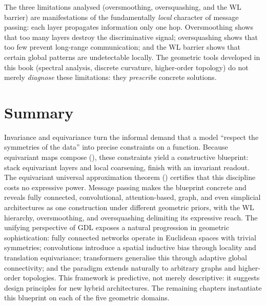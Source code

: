 The three limitations analysed (oversmoothing, oversquashing, and the WL barrier)
are manifestations of the fundamentally \emph{local} character of message
passing: each layer propagates information only one hop. Oversmoothing shows that
too many layers destroy the discriminative signal; oversquashing shows that too
few prevent long-range communication; and the WL barrier shows that certain
global patterns are undetectable locally. The geometric tools developed in this
book (spectral analysis, discrete curvature, higher-order topology) do not merely
\emph{diagnose} these limitations: they \emph{prescribe} concrete solutions.

\section{Summary}
\label{sec:priors:summary}

Invariance and equivariance turn the informal demand that a model ``respect the
symmetries of the data'' into precise constraints on a function. Because
equivariant maps compose (), these constraints yield
a constructive blueprint: stack equivariant layers and local coarsening, finish
with an invariant readout. The equivariant universal approximation theorem
() certifies that this discipline costs no expressive
power. Message passing makes the blueprint concrete and reveals fully connected,
convolutional, attention-based, graph, and even simplicial architectures as one
construction under different geometric priors, with the WL hierarchy,
oversmoothing, and oversquashing delimiting its expressive reach. The unifying
perspective of GDL exposes a natural progression in geometric sophistication:
fully connected networks operate in Euclidean spaces with trivial symmetries;
convolutions introduce a spatial inductive bias through locality and translation
equivariance; transformers generalise this through adaptive global connectivity;
and the paradigm extends naturally to arbitrary graphs and higher-order
topologies. This framework is predictive, not merely descriptive: it suggests
design principles for new hybrid architectures. The remaining chapters
instantiate this blueprint on each of the five geometric domains.
